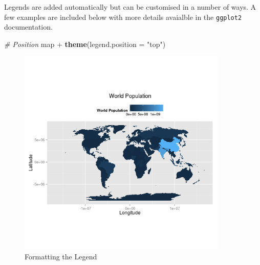 \documentclass[]{article}
\newenvironment{Shaded}{}{}
\newcommand{\KeywordTok}[1]{\textcolor[rgb]{0.00,0.44,0.13}{\textbf{{#1}}}}
\newcommand{\DataTypeTok}[1]{\textcolor[rgb]{0.56,0.13,0.00}{{#1}}}
\newcommand{\StringTok}[1]{\textcolor[rgb]{0.25,0.44,0.63}{{#1}}}
\newcommand{\CommentTok}[1]{\textcolor[rgb]{0.38,0.63,0.69}{\textit{{#1}}}}
\newcommand{\NormalTok}[1]{{#1}}
\let\Oldincludegraphics\includegraphics
\renewcommand{\includegraphics}[1]{\Oldincludegraphics[width=10cm]{#1}}
\begin{document}
Legends are added automatically but can be customised in a number of
ways. A few examples are included below with more details avaialble in
the \texttt{ggplot2} documentation.

\begin{Shaded}
\begin{Highlighting}[]
\CommentTok{# Position}
\NormalTok{map + }\KeywordTok{theme}\NormalTok{(}\DataTypeTok{legend.position =} \StringTok{"top"}\NormalTok{)}
\end{Highlighting}
\end{Shaded}
\begin{figure}[htbp]
\centering
\includegraphics{figure/Formatting_the_Legend1.png}
\caption{Formatting the Legend}
\end{figure}
\end{document}
